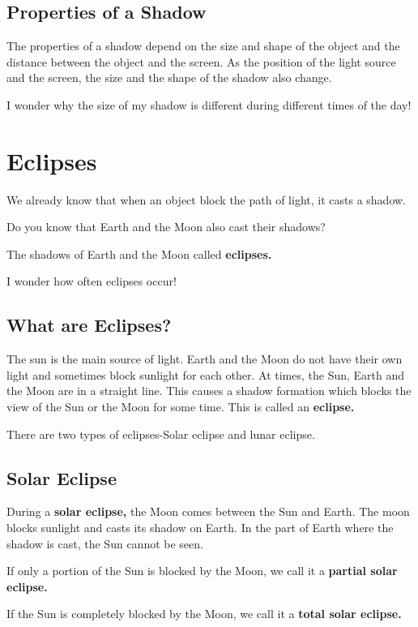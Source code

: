 \subsection{Properties of a Shadow}
The properties of a shadow depend on the size and shape of the object and the distance between the object and the screen. As the position of the light source and the screen, the size and the shape of the shadow also change.
\vspace{0.3in}
\par
I wonder why the size of my shadow is different during different times of the day!
\vspace{1.3in}
\section{Eclipses}
We already know that when an object block the path of light, it casts a shadow.
\vspace{0.1in}
\par
Do you know that Earth and the Moon also cast their shadows?
\vspace{0.1in}
\par
The shadows of Earth and the Moon called \textbf{eclipses.}
\vspace{0.3in}
\par
I wonder how often eclipses occur!
\vspace{0.8in}
\subsection{What are Eclipses?}
The sun is the main source of light. Earth and the Moon do not have their own light and sometimes block sunlight for each other. At times, the Sun, Earth and the Moon are in a straight line. This causes a shadow formation which blocks the view of the Sun or the Moon for some time. This is called an \textbf{eclipse.}
\vspace{0.1in}
\par
There are two types of eclipses-Solar eclipse and lunar eclipse.
\vspace{0.2in}
\subsection{Solar Eclipse}
During a \textbf{solar eclipse,} the Moon comes between the Sun and Earth. The moon blocks sunlight and casts its shadow on Earth. In the part of Earth where the shadow is cast, the Sun cannot be seen.
\vspace{1.5in}
\par
If only a portion of the Sun is blocked by the Moon, we call it a \textbf{partial solar eclipse.}
\vspace{0.1in}
\par
If the Sun is completely blocked by the Moon, we call it a \textbf{total solar eclipse.}
